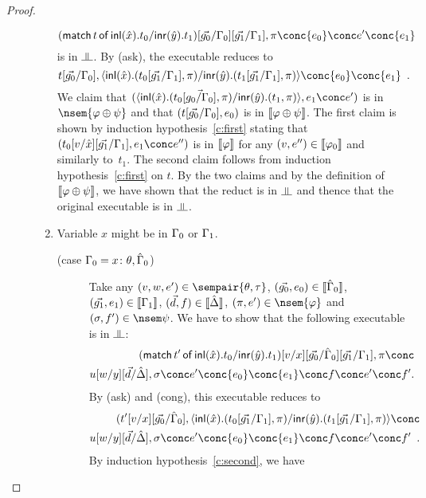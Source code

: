 \begin{proof}
\begin{description}
\begin{enumerate}[label=\textit{(\arabic{*})}]
	       \[
	       (\mat t{\hat{x}}{t_0}{\hat{y}}{t_1})[\vec{ g_0}/\G_0][\vec{g_1}/\G_1],
	       \pi\conc {e_0}\conc e'\conc {e_1}
	       \]
	       is in $\bbot$.
	       By (ask), the executable reduces to
	       \[
		t[\vec{g_0}/\G_0],
	       \mats{\hat{x}}{t_0[\vec{g_1}/\G_1]}{\pi}
	       {\hat{y}}{t_1[\vec{g_1}/\G_1]}{\pi}\conc{e_0}\conc
	       {e_1}\enspace.
	       \]
	       We claim that
	       $(\mats{\hat{x}}{t_0[\vec{g_0/\G_0}]}{\pi}{\hat{y}}{t_1}{\pi},{e_1}\conc
	       e')$ is in $\nsem{\phi\oplus\psi}$ and that
	       $(t[\vec{g_0}/\Gamma_0],{e_0})$ is in $\llbracket{\varphi\oplus\psi}\rrbracket$.  The first
	       claim is shown by induction hypothesis~\ref{c:first}
	       stating that $(t_0[v/\hat{x}][\vec{g_1}/\G_1], {e_1}\conc
	       e'')$ is in $\llbracket{\varphi}\rrbracket$ for any $(v,e'')\in\llbracket{\varphi_0}\rrbracket$
	       and similarly to~$t_1$.
	       The second claim follows from induction
	       hypothesis~\ref{c:first} on $t$.
	       By the two claims and by the definition of
	       $\llbracket{\varphi\oplus\psi}\rrbracket$,
	       we have shown that the reduct is in $\bbot$ and
	       thence that the original executable is in $\bbot$.
	 \item Variable $x$ might be in $\Gamma_0$ or $\Gamma_1$.
	       \begin{description}
		\item[(case $\Gamma_0 = {x} \colon{\theta},\hat{\Gamma}_0$)]
		     Take any
		     $(v,w,e')\in\sempair{\theta,\tau}$,
		     $(\vec{g_0},{e_0})\in\llbracket{\hat{\Gamma}_0}\rrbracket$,
		     $(\vec{g_1},{e_1})\in\llbracket{\Gamma_1}\rrbracket$,
		     $(\vec d, f)\in\llbracket{\hat{\Delta}}\rrbracket$,
		     $(\pi,e')\in\nsem{\phi}$ and
		     $(\sigma,f')\in\nsem\psi$.
		     We have to show that the following executable is in
		     $\bbot$:
		     \begin{eqnarray*}
		     (\mat{t'}{\hat x}{t_0}{\hat
		     y}{t_1})[v/x][\vec{g_0}/\hat\G_0][\vec{g_1}/\G_1],\pi\conc\\
		     u[w/y][\vec d/\hat\D],\sigma\conc e'\conc
		     {e_0}\conc {e_1}\conc  f\conc e'\conc
		     f'.
		     \end{eqnarray*}
		     By (ask) and (cong), this executable reduces to
		     \begin{eqnarray*}
		     (t'[v/x][\vec{g_0}/\hat\G_0],
		      \mats{\hat x}{t_0[\vec{g_1}/\G_1]}{\pi}{\hat y}{t_1[\vec{g_1}/\G_1]}{\pi}
		      \conc\\
		     u[w/y][\vec d/\hat\D],\sigma\conc e'\conc
		     {e_0}\conc {e_1}\conc  f\conc e'\conc
		     f'\enspace.
		     \end{eqnarray*}
		     By induction hypothesis~\ref{c:second},
		     we have

\end{description}
\end{enumerate}
\end{description}
\end{proof}
